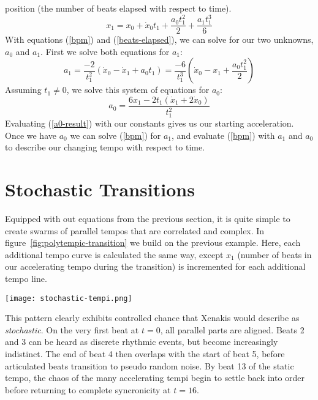 position (the number of beats elapsed with respect to time).
\begin{equation}
	\label{beats-elapsed}
	x_1 = x_0 + \dot{x}_0t_1 + \frac{a_0t_1^2}{2} + \frac{a_1t_1^3}{6}
\end{equation}
With equations (\ref{bpm}) and (\ref{beats-elapsed}), we can solve for our 
two unknowns, $a_0$ and $a_1$. First we solve both equations for $a_1$:
\begin{displaymath}
    \label{a1-solution}
    a_1=
    \frac{-2}{t_1^2}(\dot{x}_0-\dot{x}_1 + a_0t_1)=
    \frac{-6}{t_1^3}(\dot{x}_0-x_1 + \frac{a_0t_1^2}{2})
\end{displaymath}
Assuming $t_1 \neq 0$, we solve this system of equations for $a_0$:
\begin{equation}
	\label{a0-result}
	a_0=\frac{6x_1-2t_1(\dot{x}_1+2\dot{x}_0)}{t_1^2}
\end{equation}
Evaluating (\ref{a0-result}) with our constants gives us our starting
acceleration. Once we have $a_0$ we can solve (\ref{bpm}) for $a_1$, and 
evaluate (\ref{bpm}) with $a_1$ and $a_0$ to describe our changing tempo 
with respect to time.

\section{Stochastic Transitions}
\label{sec:polytempic-implementation}
Equipped with out equations from the previous section, it is quite
simple to create swarms of parallel tempos that are correlated and
complex. In figure~\ref{fig:polytempic-transition} we build on the
previous example. Here, each additional tempo curve is calculated the
same way, except $x_1$ (number of beats in our accelerating tempo
during the transition) is incremented for each additional tempo line. 
\begin{figure*}[h!]
  \texttt{[image: stochastic-tempi.png]}
  \caption{Stochastic Tempo Transition from 90~BPM to 120~BPM. Black
    dots are beats in our changing tempi. Grey dots show a
    continuation of beats at the initial tempo.
    $12 \leq x_1 \leq 20$}
  \label{fig:polytempic-transition}
\end{figure*}\hfill\break
This pattern clearly exhibits controlled chance that Xenakis would
describe as \emph{stochastic}. On the very first beat at $t=0$, all
parallel parts are aligned. Beats 2 and 3 can be heard as discrete
rhythmic events, but become increasingly indistinct. The end of beat 4
then overlaps with the start of beat 5, before articulated beats
transition to pseudo random noise. By beat 13 of the static tempo, the
chaos of the many accelerating tempi begin to settle back into order
before returning to complete syncronicity at $t=16$.

